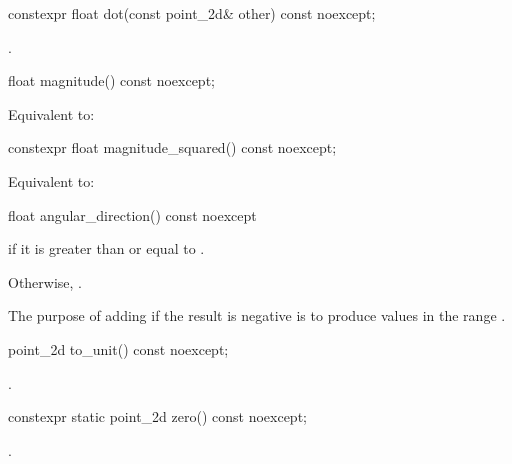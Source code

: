 %
\begin{itemdecl}
constexpr float dot(const point_2d& other) const noexcept;
\end{itemdecl}
\begin{itemdescr}
\pnum
\returns
{}.
\end{itemdescr}

%
\begin{itemdecl}
float magnitude() const noexcept;
\end{itemdecl}
\begin{itemdescr}
\pnum
\returns
Equivalent to: 
\end{itemdescr}

%
\begin{itemdecl}
constexpr float magnitude_squared() const noexcept;
\end{itemdecl}
\begin{itemdescr}
\pnum
\returns
Equivalent to: 
\end{itemdescr}

%
\begin{itemdecl}
float angular_direction() const noexcept
\end{itemdecl}
\begin{itemdescr}
\pnum
\returns
{} if it is greater than or equal to .

\pnum
Otherwise, . 

\pnum
\begin{note}
The purpose of adding  if the result is negative is to produce values in the range .
\end{note}
\end{itemdescr}

%
\begin{itemdecl}
point_2d to_unit() const noexcept;
\end{itemdecl}
\begin{itemdescr}
\pnum
\returns
{}.
\end{itemdescr}

%
\begin{itemdecl}
constexpr static point_2d zero() const noexcept;
\end{itemdecl}
\begin{itemdescr}
\pnum
\returns
{}.
\end{itemdescr}


